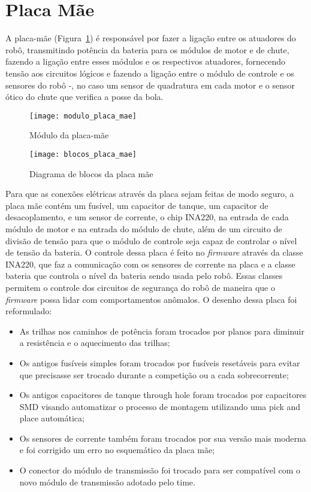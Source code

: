 \section{Placa Mãe}\label{sec:placa_mae}

A placa-mãe (Figura~\ref{fig:modulo_placa_mae}) é responsável por fazer a ligação entre os atuadores do robô, transmitindo potência da bateria para os módulos de motor e de chute, fazendo a ligação entre esses módulos e os respectivos atuadores, fornecendo tensão aos circuitos lógicos e fazendo a ligação entre o módulo de controle e os sensores do robô -, no caso um sensor de quadratura em cada motor e o sensor ótico do chute que verifica a posse da bola. 

\begin{figure}
	\centering
	\texttt{[image: modulo\_placa\_mae]}
	\caption{Módulo da placa-mãe}
	\label{fig:modulo_placa_mae}
\end{figure}

\begin{figure}
	\centering
	\texttt{[image: blocos\_placa\_mae]}
	\caption{Diagrama de blocos da placa mãe}
	\label{fig:blocos_placa_mae}
\end{figure}

Para que as conexões elétricas através da placa sejam feitas de modo seguro, a placa mãe contém um fusível, um capacitor de tanque, um capacitor de desacoplamento, e um sensor de corrente, o chip INA220, na entrada de cada módulo de motor e na entrada do módulo de chute, além de um circuito de divisão de tensão para que o módulo de controle seja capaz de controlar o nível de tensão da bateria.
O controle dessa placa é feito no \textit{firmware} através da classe INA220, que faz a comunicação com os sensores de corrente na placa e a classe bateria que controla o nível da bateria sendo usada pelo robô. Essas classes permitem o controle dos circuitos de segurança do robô de maneira que o \textit{firmware} possa lidar com comportamentos anômalos.
O desenho dessa placa foi reformulado:

\begin{itemize}
  \item As trilhas nos caminhos de potência foram trocados por planos para diminuir a resistência e o aquecimento das trilhas;
  \item Os antigos fusíveis simples foram trocados por fusíveis resetáveis para evitar que precisasse ser trocado durante a competição ou a 		cada sobrecorrente;
  \item Os antigos capacitores de tanque through hole foram trocados por capacitores SMD visando automatizar o processo de montagem utilizando 			uma pick and place automática;
  \item Os sensores de corrente também foram trocados por sua versão mais moderna e foi corrigido um erro no esquemático da placa mãe;
  \item O conector do módulo de transmissão foi trocado para ser compatível com o novo módulo de transmissão adotado pelo time.
\end{itemize}

